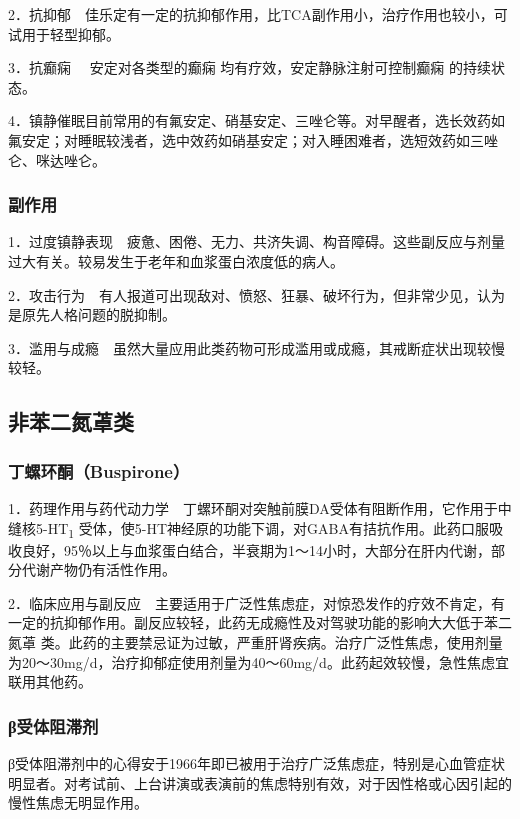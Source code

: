 2．抗抑郁　佳乐定有一定的抗抑郁作用，比TCA副作用小，治疗作用也较小，可试用于轻型抑郁。

3．抗癫痫
　安定对各类型的癫痫
均有疗效，安定静脉注射可控制癫痫
的持续状态。

4．镇静催眠目前常用的有氟安定、硝基安定、三唑仑等。对早醒者，选长效药如氟安定；对睡眠较浅者，选中效药如硝基安定；对入睡困难者，选短效药如三唑仑、咪达唑仑。

\subsubsection{副作用}

1．过度镇静表现　疲惫、困倦、无力、共济失调、构音障碍。这些副反应与剂量过大有关。较易发生于老年和血浆蛋白浓度低的病人。

2．攻击行为　有人报道可出现敌对、愤怒、狂暴、破坏行为，但非常少见，认为是原先人格问题的脱抑制。

3．滥用与成瘾　虽然大量应用此类药物可形成滥用或成瘾，其戒断症状出现较慢较轻。

\subsection{非苯二氮䓬类}

\subsubsection{丁螺环酮（Buspirone）}

1．药理作用与药代动力学　丁螺环酮对突触前膜DA受体有阻断作用，它作用于中缝核5-HT\textsubscript{1}
受体，使5-HT神经原的功能下调，对GABA有拮抗作用。此药口服吸收良好，95％以上与血浆蛋白结合，半衰期为1～14小时，大部分在肝内代谢，部分代谢产物仍有活性作用。

2．临床应用与副反应　主要适用于广泛性焦虑症，对惊恐发作的疗效不肯定，有一定的抗抑郁作用。副反应较轻，此药无成瘾性及对驾驶功能的影响大大低于苯二氮䓬
类。此药的主要禁忌证为过敏，严重肝肾疾病。治疗广泛性焦虑，使用剂量为20～30mg/d，治疗抑郁症使用剂量为40～60mg/d。此药起效较慢，急性焦虑宜联用其他药。

\subsubsection{β受体阻滞剂}

β受体阻滞剂中的心得安于1966年即已被用于治疗广泛焦虑症，特别是心血管症状明显者。对考试前、上台讲演或表演前的焦虑特别有效，对于因性格或心因引起的慢性焦虑无明显作用。


